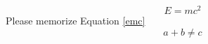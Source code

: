 \documentclass{article}
\begin{document}
	\begin{equation}
\label{emc}
E=mc^2 
\end{equation}
Please memorize Equation \ref{emc}
$$a + b \neq c$$
\end{document}
